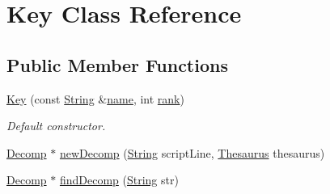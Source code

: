 \hypertarget{classKey}{}\section{Key Class Reference}
\label{classKey}
\subsection*{Public Member Functions}
\begin{DoxyCompactItemize}
\item 
\mbox{\label{classKey_a36c3d526f01554925ff00ccc03f7c353}} 
\mbox{\hyperlink{classKey_a36c3d526f01554925ff00ccc03f7c353}{Key}} (const \mbox{\hyperlink{classString}{String}} \&\mbox{\hyperlink{classKey_a2e5239c4a662635b68778364afd46a96}{name}}, int \mbox{\hyperlink{classKey_ad960b9e4804c3cb039a816811bae4839}{rank}})
\begin{DoxyCompactList}\small\item\em Default constructor. \end{DoxyCompactList}\item 
\mbox{\hyperlink{classDecomp}{Decomp}} $\ast$ \mbox{\hyperlink{classKey_aef5468eea2222639cf3bb839cdd6e6af}{new\+Decomp}} (\mbox{\hyperlink{classString}{String}} script\+Line, \mbox{\hyperlink{classThesaurus}{Thesaurus}} thesaurus)
\item 
\mbox{\hyperlink{classDecomp}{Decomp}} $\ast$ \mbox{\hyperlink{classKey_ad1ee86395985a3b7e6715597c777eeec}{find\+Decomp}} (\mbox{\hyperlink{classString}{String}} str)
\end{DoxyCompactItemize}
